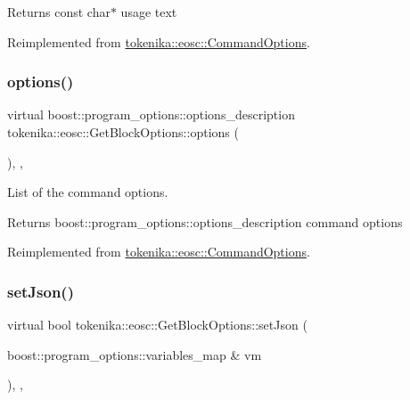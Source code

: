 \begin{DoxyReturn}{Returns}
const char$\ast$ usage text 
\end{DoxyReturn}


Reimplemented from \hyperlink{classtokenika_1_1eosc_1_1_command_options_a18ada0ba1163f7a41c9990ae2756012b}{tokenika\+::eosc\+::\+Command\+Options}.

\mbox{\label{classtokenika_1_1eosc_1_1_get_block_options_a6e8c1a240e5a529c093e0053f12e9ee5}} 
\subsubsection{\texorpdfstring{options()}{options()}}
{\footnotesize\ttfamily virtual boost\+::program\+\_\+options\+::options\+\_\+description tokenika\+::eosc\+::\+Get\+Block\+Options\+::options (\begin{DoxyParamCaption}{ }\end{DoxyParamCaption})\hspace{0.3cm}{\ttfamily [inline]}, {\ttfamily [protected]}, {\ttfamily [virtual]}}



List of the command options. 

\begin{DoxyReturn}{Returns}
boost\+::program\+\_\+options\+::options\+\_\+description command options 
\end{DoxyReturn}


Reimplemented from \hyperlink{classtokenika_1_1eosc_1_1_command_options_aa55960f380250eb7065cb6489b67196f}{tokenika\+::eosc\+::\+Command\+Options}.

\mbox{\label{classtokenika_1_1eosc_1_1_get_block_options_a71450327dcf082d00f4c3e3b5c43e619}} 
\subsubsection{\texorpdfstring{set\+Json()}{setJson()}}
{\footnotesize\ttfamily virtual bool tokenika\+::eosc\+::\+Get\+Block\+Options\+::set\+Json (\begin{DoxyParamCaption}\item[{boost\+::program\+\_\+options\+::variables\+\_\+map \&}]{vm }\end{DoxyParamCaption})\hspace{0.3cm}{\ttfamily [inline]}, {\ttfamily [protected]}, {\ttfamily [virtual]}}




